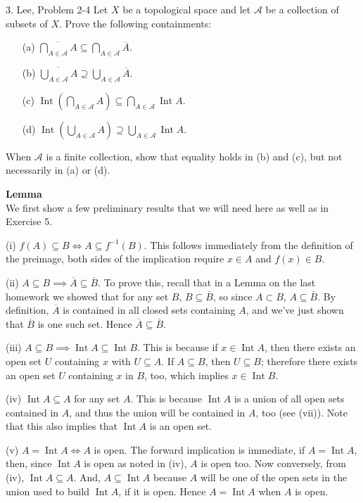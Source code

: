 \documentclass{homework}
\newcommand{\calA}{\mathcal{A}}
\DeclareMathOperator{\Int}{\mathrm{Int}}
\begin{document}
\newpage
\begin{exercise}{3. Lee, Problem 2-4}
Let $X$ be a topological space and let $\calA$ be a collection of subsets
of $X$.  Prove the following containments:
\begin{itemize}
\item[(a)] $\displaystyle\overline{\bigcap_{A\in\calA} A} \subseteq \bigcap_{A\in\calA} \overline{A}$.
\item[(b)] $\displaystyle\overline{\bigcup_{A\in\calA} A} \supseteq \bigcup_{A\in\calA} \overline{A}$.
\item[(c)] $\displaystyle\Int\left(\bigcap_{A\in\calA} A\right) \subseteq \bigcap_{A\in\calA}\Int A$.
\item[(d)] $\displaystyle\Int\left(\bigcup_{A\in\calA} A\right) \supseteq \bigcup_{A\in\calA}\Int A$.
\end{itemize}
When $\calA$ is a finite collection, show that equality holds in (b) and (c), but
not necessarily in (a) or (d).
\end{exercise}
\solution
\textbf{Lemma}\\
We first show a few preliminary results that we will need here
as well as in Exercise 5.

(i) $f(A)\subseteq B \iff A \subseteq f^{-1}(B)$.  This follows immediately
from the definition of the preimage, both sides of the implication
require $x\in A$ and $f(x)\in B$.

(ii) $A\subseteq B \implies \overline{A} \subseteq \overline{B}$.  To prove
this, recall that in a Lemma on the last homework we showed that
for any set $B$, $B\subseteq\overline{B}$, so since 
$A\subset B$, $A\subseteq \overline{B}$. By definition, $\overline{A}$
is contained in all closed sets containing $A$, and we've just shown
that $\overline{B}$ is one such set.  Hence $\overline{A}\subseteq\overline{B}$.

(iii) $A\subseteq B \implies \Int A \subseteq \Int B$.
This is because
if $x\in\Int A$, then there exists an open set $U$ containing $x$ with
$U\subseteq A$.  If $A\subseteq B$, then $U\subseteq B$; therefore there
exists an open set $U$ containing $x$ in $B$, too, which implies
$x\in\Int B$.

(iv) $\Int A\subseteq A$ for any set $A$.  
This is because $\Int A$ is a union of all open sets contained in
$A$, and thus the union will be contained in $A$, too (see (vii)).  Note that
this also implies that $\Int A$ is an open set.

(v) $A=\Int A \iff A$ is open.  The forward implication is immediate,
if $A=\Int A$, then, since $\Int A$ is open as noted in (iv), $A$ is open too.
Now conversely, from (iv), $\Int A\subseteq A$.
And, $A\subseteq \Int A$ because $A$ will be one of the open sets in the
union used to build $\Int A$, if it is open.
Hence $A=\Int A$ when $A$ is open.
\end{document}

